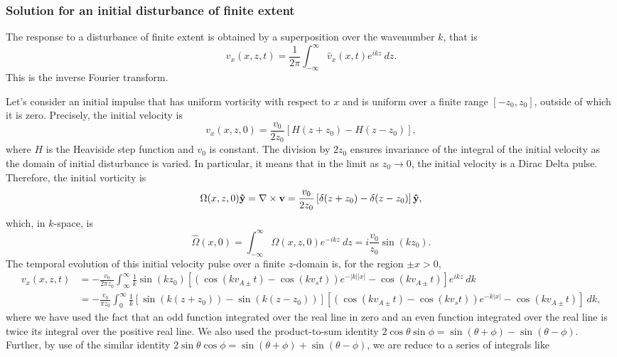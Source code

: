\documentclass[12pt]{../style-files/ociamthesis}
\begin{document}
\subsubsection{Solution for an initial disturbance of finite extent}

The response to a disturbance of finite extent is obtained by a superposition over the wavenumber $k$, that is
\begin{equation}
v_x(x, z, t) = \frac{1}{2\pi}\int_{-\infty}^{\infty} \hat{v}_x(x, t) e^{ikz} ~dz.
\end{equation}
This is the inverse Fourier transform.

Let's consider an initial impulse that has uniform vorticity with respect to $x$ and is uniform over a finite range $[-z_0, z_0]$, outside of which it is zero. Precisely, the initial velocity is
\begin{equation}
v_x(x, z, 0) = \frac{v_0}{2z_0}\left[H(z + z_0) - H(z - z_0)\right],
\end{equation}
where $H$ is the Heaviside step function and $v_0$ is constant. The division by $2z_0$ ensures invariance of the integral of the initial velocity as the domain of initial disturbance is varied. In particular, it means that in the limit as $z_0 \to 0$, the initial velocity is a Dirac Delta pulse. Therefore, the initial vorticity is
\begin{equation}
\Omega(x, z, 0) \mathbf{\hat{y}} = \nabla \times \mathbf{v} = \frac{v_0}{2z_0}\left[\delta(z + z_0) - \delta(z - z_0)\right] \mathbf{\hat{y}},
\end{equation}
which, in $k$-space, is
\begin{equation}
\hat{\Omega}(x, 0) = \int_{-\infty}^{\infty} \Omega(x, z, 0) e^{-ikz} ~dz = i\frac{v_0}{z_0}\sin(kz_0).
\end{equation}
The temporal evolution of this initial velocity pulse over a finite $z$-domain is, for the region $\pm x > 0$,
\begin{align}
v_x(x, z, t) &= -\frac{v_0}{2\pi z_0} \int_{\infty}^{\infty} \frac{1}{k}\sin(kz_0) \left[\left(\cos(kv_{A\pm}t) - \cos(kv_st)\right)e^{-|k||x|} - \cos(kv_{A\pm}t)\right] e^{ikz} ~dk \\
& = -\frac{v_0}{\pi z_0} \int_{0}^{\infty} \frac{1}{k} \left[\sin(k(z + z_0)) - \sin(k(z - z_0))\right] \left[(\cos(kv_{A\pm}t) - \cos(kv_st))e^{-k|x|} - \cos(kv_{A\pm}t)\right] ~dk,
\end{align}
where we have used the fact that an odd function integrated over the real line in zero and an even function integrated over the real line is twice its integral over the positive real line. We also used the product-to-sum identity $2\cos{\theta}\sin{\phi} = \sin(\theta + \phi) - \sin(\theta - \phi)$. Further, by use of the similar identity $2\sin{\theta}\cos{\phi} = \sin(\theta + \phi) + \sin(\theta - \phi)$, we are reduce to a series of integrals like
\end{document}
